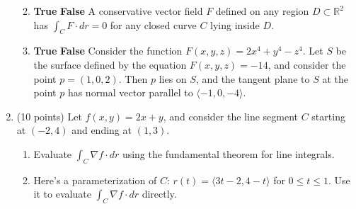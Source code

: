 \documentclass[12 pt]{report}
\begin{document}
\begin{enumerate}
\begin{enumerate}
\vfill

\item \textbf{True} \hspace{5pt} \textbf{False} \hspace{10pt} A conservative vector field $F$ defined on any region $D \subset \mathbb{R}^2$ has $\int_C F \cdot dr = 0$ for any closed curve $C$ lying inside $D$. 

\vfill

\item \textbf{True} \hspace{5pt} \textbf{False} \hspace{10pt} Consider the function $F(x,y,z) = 2x^4 + y^4 -z^4$. Let $S$ be the surface defined by the equation $F(x,y,z) = -14$, and consider the point $p = (1,0,2)$. Then $p$ lies on $S$, and the tangent plane to $S$ at the point $p$ has normal vector parallel to $\langle -1, 0, -4 \rangle$. 

\vfill

\end{enumerate}

\newpage


\item (10 points) Let $f(x,y) = 2x + y$, and consider the line segment $C$ starting at $(-2, 4)$ and ending at $(1,3)$. 

\begin{enumerate} \item Evaluate $\int_C \nabla f \cdot dr$ using the fundamental theorem for line integrals. 

\vfill

\item Here's a parameterization of $C$: $r(t) = \langle 3t-2, 4-t \rangle$ for $0 \leq t \leq 1$. Use it to evaluate $\int_C \nabla f \cdot dr$ directly.

\vfill

\end{enumerate}

\end{enumerate}
\end{document}
